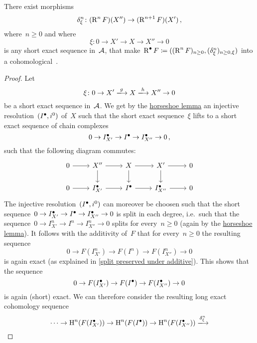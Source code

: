 \begin{theorem}
  \label{construction is delta functor}
  There exist morphisms
  \[
    \delta^n_\xi
    \colon
    (\operatorname{R}^n F)(X'')
    \to
    (\operatorname{R}^{n+1} F)(X') \,,
  \]
  where~$n \geq 0$ and where
  \[
    \xi
    \colon
    0
    \to
    X'
    \to
    X
    \to
    X''
    \to
    0
  \]
  is any short exact sequence in~$\mathcal{A}$, that make~$\operatorname{R}^\bullet F \coloneqq ( (\operatorname{R}^n F)_{n \geq 0}, (\delta^n_\xi)_{n \geq 0, \xi} )$ into a cohomological~{\deltafun}.
\end{theorem}


\begin{proof}
  Let
  \[
    \xi
    \colon
    0
    \to
    X'
    \xlongto{g}
    X
    \xlongto{h}
    X''
    \to
    0
  \]
  be a short exact sequence in~$\mathcal{A}$.
  We get by the \hyperref[horseshoe lemma]{horseshoe lemma} an injective resolution~$(I^\bullet, i^0)$ of~$X$ such that the short exact sequence~$\xi$ lifts to a short exact sequence of chain complexes
  \[
    0
    \to
    I^\bullet_{X'}
    \to
    I^\bullet
    \to
    I^\bullet_{X''}
    \to
    0 \,,
  \]
  such that the following diagram commutes:
  \[
    \begin{tikzcd}
        0
        \arrow{r}
      & X''
        \arrow{r}
        \arrow{d}
      & X
        \arrow{r}
        \arrow{d}
      & X'
        \arrow{r}
        \arrow{d}
      & 0
      \\
        0
        \arrow{r}
      & \Iccc_{X'}
        \arrow{r}
      & \Iccc
        \arrow{r}
      & \Iccc_{X''}
        \arrow{r}
      & 0
    \end{tikzcd}
  \]
  The injective resolution~$(I^\bullet, i^0)$ can moreover be choosen such that the short sequence~$0 \to I^\bullet_{X'} \to I^\bullet \to I^\bullet_{X''} \to 0$ is split in each degree, i.e.\ such that the sequence~$0 \to I_{X'}^n \to I^n \to I_{X''}^n \to 0$ splits for every~$n \geq 0$ (again by the \hyperref[horseshoe lemma]{horseshoe lemma}).
  It follows with the additivity of~$F$ that for every~$n \geq 0$ the resulting sequence
  \[
    0
    \to
    F(I_{X'}^n)
    \to
    F(I^n)
    \to
    F(I_{X''}^n)
    \to
    0
  \]
  is again exact (as explained in \cref{split preserved under additive}).
  This shows that the sequence
  \[
    0
    \to
    F(I^\bullet_{X'})
    \to
    F(I^\bullet)
    \to
    F(I^\bullet_{X''})
    \to
    0
  \]
  is again (short) exact.
  We can therefore consider the resulting long exact cohomology sequence
  \[
    \dotsb
    \to
    \Hl^n(F(\Iccc_{X'}))
    \to
    \Hl^n(F(\Iccc))
    \to
    \Hl^n(F(\Iccc_{X''}))
    \xlongto{ \delta^n_\xi }
\]
\end{proof}

